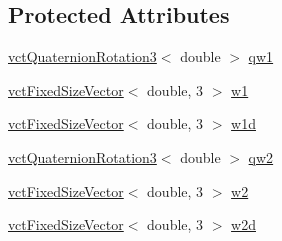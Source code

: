 \subsection*{Protected Attributes}
\begin{DoxyCompactItemize}
\item 
\hyperlink{classvct_quaternion_rotation3}{vct\-Quaternion\-Rotation3}$<$ double $>$ \hyperlink{classrob_function_s_o3_ab39d2e94ec47a7218e8e42209243c628}{qw1}
\item 
\hyperlink{classvct_fixed_size_vector}{vct\-Fixed\-Size\-Vector}$<$ double, 3 $>$ \hyperlink{classrob_function_s_o3_a458bc7e9276f38ec681ad5e3a733e73e}{w1}
\item 
\hyperlink{classvct_fixed_size_vector}{vct\-Fixed\-Size\-Vector}$<$ double, 3 $>$ \hyperlink{classrob_function_s_o3_ae01c6c68ea9ed10bf462d7103cf3ed7d}{w1d}
\item 
\hyperlink{classvct_quaternion_rotation3}{vct\-Quaternion\-Rotation3}$<$ double $>$ \hyperlink{classrob_function_s_o3_ae8f7673ef36c4dcf8af771af852b974d}{qw2}
\item 
\hyperlink{classvct_fixed_size_vector}{vct\-Fixed\-Size\-Vector}$<$ double, 3 $>$ \hyperlink{classrob_function_s_o3_af26136555c376caff1bb1e84f1b3b3f1}{w2}
\item 
\hyperlink{classvct_fixed_size_vector}{vct\-Fixed\-Size\-Vector}$<$ double, 3 $>$ \hyperlink{classrob_function_s_o3_a888acaf14bf3ff075b5a13e811e52ab0}{w2d}
\end{DoxyCompactItemize}


